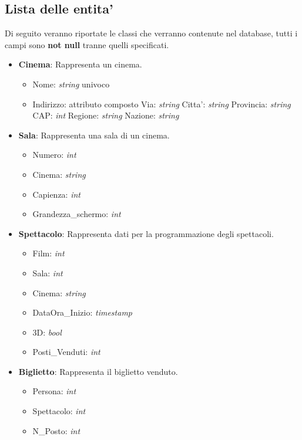 \documentclass[10pt]{article}
\begin{document}
	\subsection{Lista delle entita'}
	Di seguito veranno riportate le classi che verranno contenute nel database, tutti i campi sono \textbf{not null} tranne quelli specificati.\\
	\begin{itemize}
		\item \textbf{Cinema}: Rappresenta un cinema.
		\begin{itemize}
			\item Nome: \textit{string} univoco
			\item Indirizzo: attributo composto
				\subitem Via: \textit{string}
				\subitem Citta': \textit{string}
				\subitem Provincia: \textit{string}
				\subitem CAP: \textit{int}
				\subitem Regione: \textit{string}
				\subitem Nazione: \textit{string}			
		\end{itemize}
		\item \textbf{Sala}: Rappresenta una sala di un cinema.
		\begin{itemize}
		    \item Numero: \textit{int}
		    \item Cinema: \textit{string}
			\item Capienza: \textit{int}
			\item Grandezza\_schermo: \textit{int}
		\end{itemize}
		\item \textbf{Spettacolo}: Rappresenta dati per la programmazione degli spettacoli.
		\begin{itemize}
			\item Film: \textit{int}
			\item Sala: \textit{int}
			\item Cinema: \textit{string}
			\item DataOra\_Inizio: \textit{timestamp}
			\item 3D: \textit{bool}
			\item Posti\_Venduti: \textit{int}
		\end{itemize}
		\item \textbf{Biglietto}: Rappresenta il biglietto venduto.
		\begin{itemize}
			\item Persona: \textit{int}
			\item Spettacolo: \textit{int}
			\item N\_Posto: \textit{int}
		\end{itemize}

\end{itemize}
\end{document}
